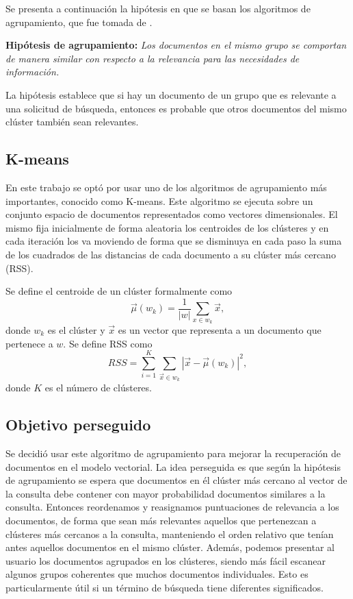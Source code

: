 \documentclass{llncs}
\begin{document}
	Se presenta a continuaci\'on la hip\'otesis en que se basan los algoritmos de agrupamiento, que fue tomada de \cite[Secci\'on 16.1]{B1}.
	
	\vspace{1em}
	\textbf{Hip\'otesis de agrupamiento:} \textit{Los documentos en el mismo grupo se comportan de manera similar con respecto a la relevancia para las necesidades de información.}
	
	\vspace{0.3em}
	La hipótesis establece que si hay un documento de un grupo que es relevante a una solicitud de búsqueda, entonces es probable que otros documentos del mismo clúster también sean relevantes. 
	\vspace{1em}
	
	\subsection{K-means}
		En este trabajo se opt\'o por usar uno de los algoritmos de agrupamiento m\'as importantes, conocido como K-means. Este algoritmo se ejecuta sobre un conjunto espacio de documentos representados como vectores dimensionales. El mismo fija inicialmente de forma aleatoria los centroides de los cl\'usteres y en cada iteraci\'on los va moviendo de forma que se disminuya en cada paso la suma de los cuadrados de las distancias de cada documento a su cl\'uster m\'as cercano (RSS).
		
		Se define el centroide de un cl\'uster formalmente como 
		\[
		\overrightarrow{\mu}(w_k) = \frac{1}{|w|}\sum_{x \in w_k} \overrightarrow{x},
		\]
		donde $w_k$ es el cl\'uster y $\overrightarrow{x}$ es un vector que representa a un documento que pertenece a $w$. Se define RSS como 
		\[
			RSS = \sum_{i = 1}^K \sum_{\overrightarrow{x} \in w_k} |\overrightarrow{x} - \overrightarrow{\mu}(w_k)|^2,
		\]
		donde $K$ es el n\'umero de cl\'usteres.
	
	\subsection{Objetivo perseguido}
	
	Se decidi\'o usar este algoritmo de agrupamiento para mejorar la recuperaci\'on de documentos en el modelo vectorial. La idea perseguida es que seg\'un la hip\'otesis de agrupamiento se espera que documentos en \'el cl\'uster m\'as cercano al vector de la consulta debe contener con mayor probabilidad documentos similares a la consulta. Entonces reordenamos y reasignamos puntuaciones de relevancia a los documentos, de forma que sean m\'as relevantes aquellos que pertenezcan a cl\'usteres m\'as cercanos a la consulta, manteniendo el orden relativo que ten\'ian antes aquellos documentos en el mismo cl\'uster. Adem\'as, podemos presentar al usuario los documentos agrupados en los cl\'usteres, siendo m\'as f\'acil escanear algunos grupos
	coherentes que muchos documentos individuales. Esto es particularmente \'util
	si un t\'ermino de b\'usqueda tiene diferentes significados.
	 
\end{document}
